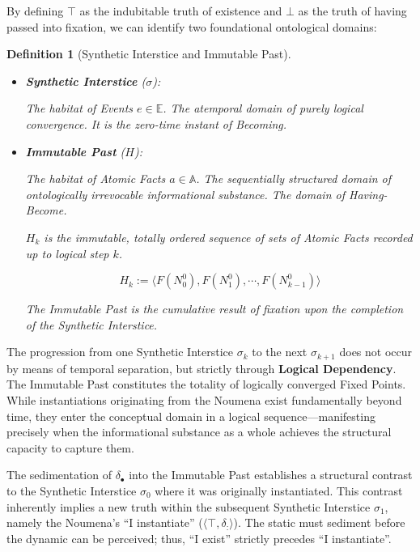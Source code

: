 \documentclass[11pt, a4paper]{article}
\theoremstyle{formalism}
\newtheorem{formalism}{Definition}
\begin{document}
By defining $\top$ as the indubitable truth of existence and $\bot$ as the
truth of having passed into fixation, we can identify two foundational
ontological domains:

\begin{formalism}[Synthetic Interstice and Immutable Past]

    \begin{itemize}
        \item \textbf{Synthetic Interstice} ($\sigma$): 
 
        The habitat of Events $e \in \mathbb{E}$. The atemporal domain of 
        purely logical convergence. It is the zero-time instant of \textit{Becoming}.
        
        \item \textbf{Immutable Past} ($H$): 

        The habitat of Atomic Facts $a \in \mathbb{A}$. The sequentially structured
        domain of ontologically irrevocable informational substance. The domain
        of \textit{Having-Become}.

        $H_k$ is the immutable, totally ordered sequence of sets of Atomic Facts 
        recorded up to logical step $k$.

        \begin{equation}
            H_k := \langle \mathit{F}(N^0_0), \mathit{F}(N^0_1), \cdots, \mathit{F}(N^0_{k-1}) \rangle
        \end{equation}

        The Immutable Past is the cumulative result of fixation upon the completion
        of the Synthetic Interstice.
    \end{itemize}

\end{formalism}

The progression from one Synthetic Interstice $\sigma_k$ to the next
$\sigma_{k+1}$ does not occur by means of temporal separation, but strictly
through \textbf{Logical Dependency}. The Immutable Past constitutes the totality
of logically converged Fixed Points. While instantiations originating from the
Noumena exist fundamentally beyond time, they enter the conceptual domain in a
logical sequence---manifesting precisely when the informational substance as a
whole achieves the structural capacity to capture them.

The sedimentation of $\delta_\bullet$ into the Immutable Past establishes a
structural contrast to the Synthetic Interstice $\sigma_0$ where it
was originally instantiated. This contrast inherently implies a new truth
within the subsequent Synthetic Interstice $\sigma_1$, namely the Noumena's
``I instantiate'' ($\langle \top, \delta_{:} \rangle$). The static must
sediment before the dynamic can be perceived; thus, ``I exist'' strictly
precedes ``I instantiate''.
\end{document}
